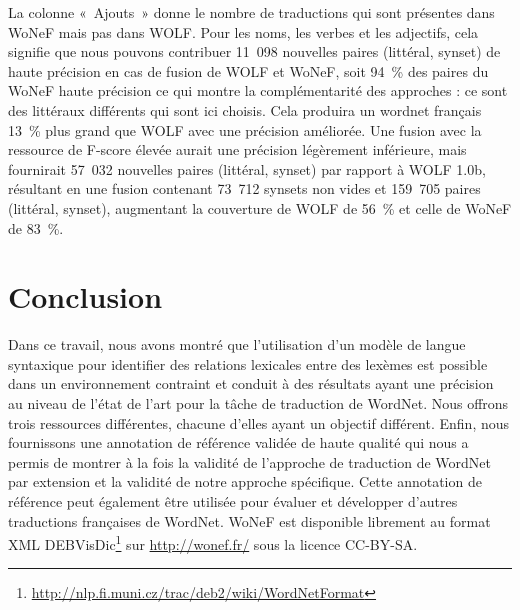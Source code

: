 La colonne «~Ajouts~» donne le nombre de traductions qui sont présentes dans WoNeF mais pas dans WOLF. Pour les noms, les verbes et les adjectifs, cela signifie que nous pouvons contribuer 11~098 nouvelles paires (littéral, synset) de haute précision en cas de fusion de WOLF et WoNeF, soit 94~\% des paires du WoNeF haute précision ce qui montre la complémentarité des approches : ce sont des littéraux différents qui sont ici choisis. Cela produira un wordnet français 13~\% plus grand que WOLF avec une précision améliorée. Une fusion avec la ressource de F-score élevée aurait une précision légèrement inférieure, mais fournirait 57~032 nouvelles paires (littéral, synset) par rapport à WOLF 1.0b, résultant en une fusion contenant 73~712 synsets non vides et 159~705 paires (littéral, synset), augmentant la couverture de WOLF de 56~\% et celle de WoNeF de 83~\%.


\section*{Conclusion}

Dans ce travail, nous avons montré que l'utilisation d'un modèle de langue syntaxique pour identifier des relations lexicales entre des lexèmes est possible dans un environnement contraint et conduit à des résultats ayant une précision au niveau de l'état de l'art pour la tâche de traduction de WordNet. Nous offrons trois ressources différentes, chacune d'elles ayant un objectif différent. Enfin, nous fournissons une annotation de référence validée de haute qualité qui nous a permis de montrer à la fois la validité de l'approche de traduction de WordNet par extension et la validité de notre approche spécifique. Cette annotation de référence peut également être utilisée pour évaluer et développer d'autres traductions françaises de WordNet. WoNeF est disponible librement au format XML DEBVisDic\footnote{\url{http://nlp.fi.muni.cz/trac/deb2/wiki/WordNetFormat}} sur \url{http://wonef.fr/} sous la licence CC-BY-SA.

